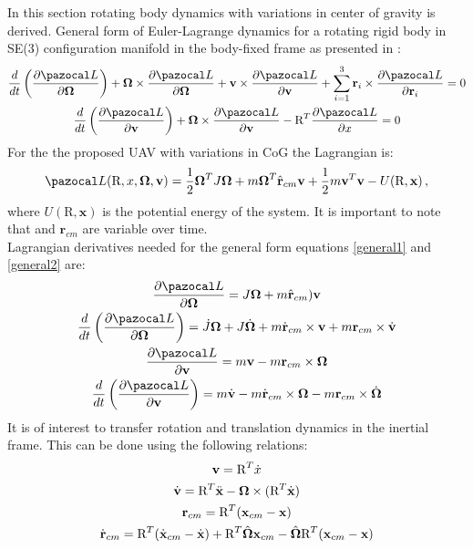 In this section rotating body dynamics with variations in center of gravity is derived.
General form of Euler-Lagrange dynamics for a rotating rigid body in SE(3) configuration manifold in the body-fixed frame as presented in \cite{LeeModel}:
\begin{gather}
	\frac{d}{dt} \left( \frac{\partial \La}{\partial \mb{\Omega}} \right)
	+ \mb{\Omega} \times \frac{\partial \La}{\partial \mb{\Omega}} 
	+ \textbf{v} \times \frac{\partial \La}{\partial \textbf{v}} 
	+ \sum_{i=1}^{3} \textbf{r}_i \times \frac{\partial \La}{\partial \textbf{r}_i} = 0 \label{general1}\\
	\frac{d}{dt} \left( \frac{\partial \La}{\partial \textbf{v}} \right)
	+ \mb{\Omega} \times \frac{\partial \La}{\partial \textbf{v}} 
	- \text{R}^T \frac{\partial \La}{\partial x} = 0 \label{general2}
\end{gather}
For the the proposed UAV with variations in CoG the Lagrangian is:
\begin{equation}
	\La(\text{R},x,\mb{\Omega},\textbf{v}) = \frac{1}{2}\mb{\Omega}^TJ\mb{\Omega} + m \mb{\Omega}^T \hat{\textbf{r}}_{cm}\textbf{v} + \frac{1}{2}m\textbf{v}^T\textbf{v} - U(\text{R},\textbf{x}) \, ,
\end{equation}
where $U(\text{R}, \textbf{x})$ is the potential energy of the system. It is important to note that  and $\textbf{r}_{cm}$ are variable over time. \\
Lagrangian derivatives needed for the general form equations \ref{general1} and \ref{general2} are:
\begin{gather}
	\frac{\partial \La}{\partial \mb{\Omega}} = J\mb{\Omega} + m \hat{\textbf{r}}_{cm})\textbf{v} \label{d1}\\ 
	\frac{d}{dt} \left( \frac{\partial \La}{\partial \mb{\Omega}} \right) = \dot{J} \mb{\Omega} + J \dot{\mb{\Omega}} + m \dot{\textbf{r}}_{cm} \times \textbf{v} + m \textbf{r}_{cm} \times \dot{\textbf{v}} \label{d2}\\ 
	\frac{\partial \La}{\partial \textbf{v}} = m\textbf{v} - m\textbf{r}_{cm} \times \mb{\Omega} \label{d3}\\ 
	\frac{d}{dt} \left( \frac{\partial \La}{\partial \textbf{v}} \right) = m\dot{\textbf{v}} - m\dot{\textbf{r}}_{cm} \times \mb{\Omega} - m \textbf{r}_{cm} \times \dot{\mb{\Omega}} \label{d4}
\end{gather}
It is of interest to transfer rotation and translation dynamics in the inertial frame. This can be done using the following relations:
\begin{gather}
	\textbf{v} = \text{R}^T \dot{x} \label{inertial1}\\
	\dot{\textbf{v}} = \text{R}^T \ddot{\textbf{x}} - \boldsymbol{\Omega} \times (\text{R}^T \dot{\textbf{x}} ) \label{inertial2} \\
	\textbf{r}_{cm} = \text{R}^T(\textbf{x}_{cm} - \textbf{x}) \label{inertial3} \\
	\dot{\textbf{r}}_{cm} = \text{R}^T(\dot{\textbf{x}}_{cm} - \dot{\textbf{x}}) + \text{R}^T\hat{\boldsymbol{\Omega}}\textbf{x}_{cm} - \hat{\boldsymbol{\Omega}}\text{R}^T(\textbf{x}_{cm} - \textbf{x}) \label{inertial4}
\end{gather}
